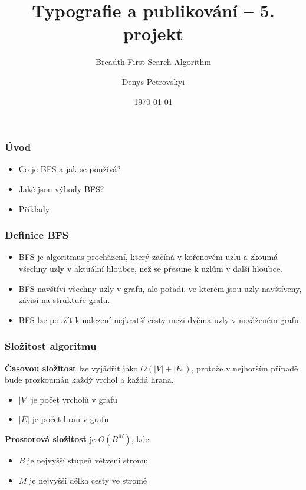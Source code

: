 \documentclass[11pt]{beamer}
\title{Typografie a publikování -- 5. projekt}
\subtitle{Breadth-First Search Algorithm}
\author{Denys Petrovskyi}
\date{\today}
\begin{document}
\begin{frame}
    \maketitle
\end{frame}

\begin{frame}
    \frametitle{Úvod}
    \begin{itemize}
        \item Co je BFS a jak se používá?
        \item Jaké jsou výhody BFS?
        \item Příklady
    \end{itemize}
\end{frame}

\begin{frame}
    \frametitle{Definice BFS}
    \begin{itemize}
        \item BFS je algoritmus procházení, 
        který začíná v kořenovém uzlu a zkoumá všechny uzly v aktuální hloubce, 
        než se přesune k uzlům v další hloubce.
        \item BFS navštíví všechny uzly v grafu, ale pořadí, ve 
        kterém jsou uzly navštíveny, závisí na struktuře grafu.
        \item BFS lze použít k nalezení nejkratší cesty mezi dvěma uzly v neváženém grafu.
    \end{itemize}
\end{frame}

\begin{frame}
    \frametitle{Složitost algoritmu}
    \textbf{Časovou složitost} lze vyjádřit jako $O ( | V | + | E | )$,
    protože v nejhorším případě bude prozkoumán každý vrchol a každá hrana.
    \begin{itemize}
        \item $|V|$ je počet vrcholů v grafu
        \item $|E|$ je počet hran v grafu
    \end{itemize}
    \textbf{Prostorová složitost} je $O(B^M)$, kde:
    \begin{itemize}
        \item $B$ je nejvyšší stupeň větvení stromu
        \item $M$ je nejvyšší délka cesty ve stromě
    \end{itemize}
\end{frame}
\end{document}
